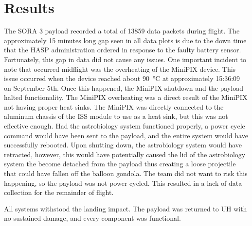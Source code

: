 \section{Results}
\label{sec:Results}

The SORA 3 payload recorded a total of 13859 data packets during flight.
The approximately 15 minutes long gap seen in all data plots is due to the down time that the HASP administration ordered in response to the faulty battery sensor.
Fortunately, this gap in data did not cause any issues.
One important incident to note that occurred midflight was the overheating of the MiniPIX device.
This issue occurred when the device reached about \SI{90}{\celsius} at approximately 15:36:09 on September 5th.
Once this happened, the MiniPIX shutdown and the payload halted functionality.
The MiniPIX overheating was a direct result of the MiniPIX not having proper heat sinks.
The MiniPIX was directly connected to the aluminum chassis of the ISS module to use as a heat sink, but this was not effective enough.
Had the astrobiology system functioned properly, a power cycle command would have been sent to the payload, and the entire system would have successfully rebooted.
Upon shutting down, the astrobiology system would have retracted, however, this would have potentially caused the lid of the astrobiology system the become detached from the payload thus creating a loose projectile that could have fallen off the balloon gondola.
The team did not want to risk this happening, so the payload was not power cycled.
This resulted in a lack of data collection for the remainder of flight.

All systems withstood the landing impact.
The payload was returned to UH with no sustained damage, and every component was functional.
